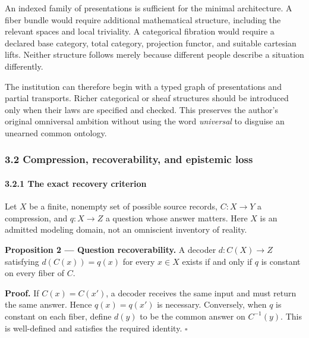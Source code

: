 \documentclass[
  10pt,
]{article}
\begin{document}
An indexed family of presentations is sufficient for the minimal architecture. A fiber bundle would require additional mathematical structure, including the relevant spaces and local triviality. A categorical fibration would require a declared base category, total category, projection functor, and suitable cartesian lifts. Neither structure follows merely because different people describe a situation differently.

The institution can therefore begin with a typed graph of presentations and partial transports. Richer categorical or sheaf structures should be introduced only when their laws are specified and checked. This preserves the author's original omniversal ambition without using the word \emph{universal} to disguise an unearned common ontology.

\subsubsection{3.2 Compression, recoverability, and epistemic loss}\label{compression-recoverability-and-epistemic-loss}

\paragraph{3.2.1 The exact recovery criterion}\label{the-exact-recovery-criterion}

Let \protect\hypertarget{math-E0020-0024}{}{\(X\)} be a finite, nonempty set of possible source records, \protect\hypertarget{math-E0021-0025}{}{\(C:X\to Y\)} a compression, and \protect\hypertarget{math-E0022-0026}{}{\(q:X\to Z\)} a question whose answer matters. Here \protect\hypertarget{math-E0020-0027}{}{\(X\)} is an admitted modeling domain, not an omniscient inventory of reality.

\textbf{Proposition 2 --- Question recoverability.} A decoder \protect\hypertarget{math-E0023-0028}{}{\(d:C(X)\to Z\)} satisfying \protect\hypertarget{math-E0024-0029}{}{\(d(C(x))=q(x)\)} for every \protect\hypertarget{math-E0025-0030}{}{\(x\in X\)} exists if and only if \protect\hypertarget{math-E0002-0031}{}{\(q\)} is constant on every fiber of \protect\hypertarget{math-E0026-0032}{}{\(C\)}.

\textbf{Proof.} If \protect\hypertarget{math-E0027-0033}{}{\(C(x)=C(x')\)}, a decoder receives the same input and must return the same answer. Hence \protect\hypertarget{math-E0028-0034}{}{\(q(x)=q(x')\)} is necessary. Conversely, when \protect\hypertarget{math-E0002-0035}{}{\(q\)} is constant on each fiber, define \protect\hypertarget{math-E0029-0036}{}{\(d(y)\)} to be the common answer on \protect\hypertarget{math-E0030-0037}{}{\(C^{-1}(y)\)}. This is well-defined and satisfies the required identity. \protect\hypertarget{math-E0019-0038}{}{\(\square\)}
\end{document}
